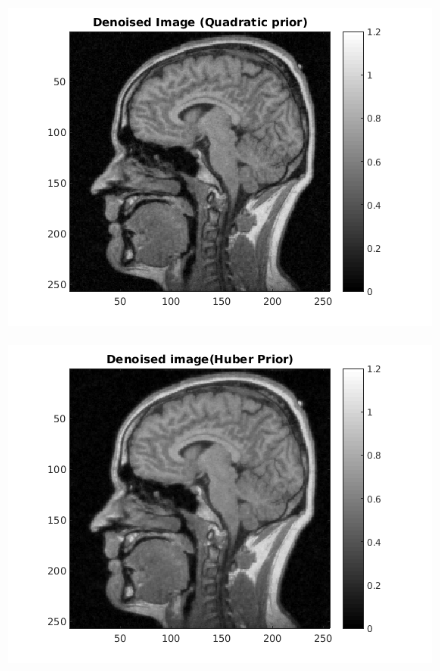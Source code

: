 \documentclass[11pt]{article}
\begin{document}
\begin{figure}[h]
\centering
\includegraphics[scale=0.7]{DenoisedQuad}
\end{figure}

\begin{figure}[h]
\centering
\includegraphics[scale=0.7]{DenoisedHuber}
\end{figure}
\end{document}
